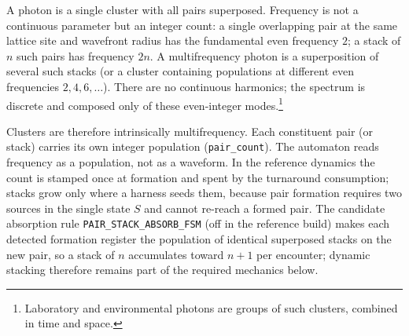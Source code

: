 \documentclass[a4paper]{article}
\begin{document}
A photon is a single cluster with all pairs superposed. Frequency is not a continuous parameter but an integer count: a single overlapping pair at the same lattice site and wavefront radius has the fundamental even frequency $2$; a stack of $n$ such pairs has frequency $2n$. A multifrequency photon is a superposition of several such stacks (or a cluster containing populations at different even frequencies $2,4,6,\dots$). There are no continuous harmonics; the spectrum is discrete and composed only of these even-integer modes.\footnote{Laboratory and environmental photons are groups of such clusters, combined in time and space.}

Clusters are therefore intrinsically multifrequency. Each constituent pair (or stack) carries its own integer population (\texttt{pair\_count}). The automaton reads frequency as a population, not as a waveform. In the reference dynamics the count is stamped once at formation and spent by the turnaround consumption; stacks grow only where a harness seeds them, because pair formation requires two sources in the single state $S$ and cannot re-reach a formed pair. The candidate absorption rule \texttt{PAIR\_STACK\_ABSORB\_FSM} (off in the reference build) makes each detected formation register the population of identical superposed stacks on the new pair, so a stack of $n$ accumulates toward $n+1$ per encounter; dynamic stacking therefore remains part of the required mechanics below.
\end{document}
